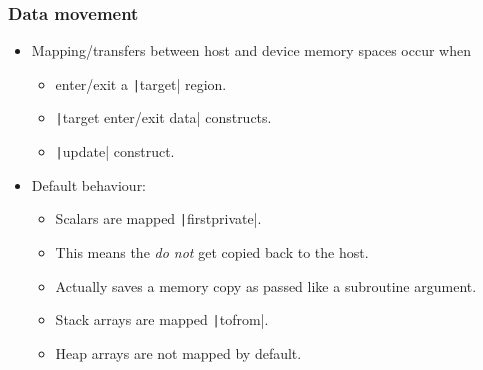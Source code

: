 \documentclass{beamer}
\begin{document}
\begin{frame}
\frametitle{Data movement}

\begin{itemize}
  \item Mapping/transfers between host and device memory spaces occur when
    \begin{itemize}
      \item enter/exit a \texttt|target| region.
      \item \texttt|target enter/exit data| constructs.
      \item \texttt|update| construct.
    \end{itemize}

\vfill

  \item Default behaviour:
    \begin{itemize}
      \item Scalars are mapped \texttt|firstprivate|.
      \item This means the \emph{do not} get copied back to the host.
      \item Actually saves a memory copy as passed like a subroutine argument.

\vfill

      \item Stack arrays are mapped \texttt|tofrom|.
      \item Heap arrays are not mapped by default.
    \end{itemize}
\end{itemize}
\end{frame}

\end{document}
